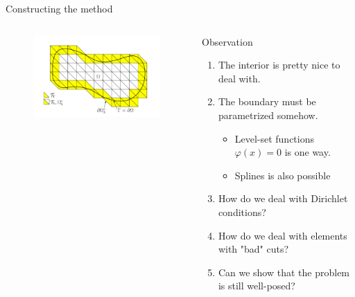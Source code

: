 \begin{frame}{Constructing the method}
        \begin{columns}
        \begin{column}{0.5\textwidth}
        \begin{figure}
            \centering
            \includegraphics[width=8.2cm]{figures/minimal_subset.png}
        \end{figure}
        \end{column}

        \begin{column}{0.5\textwidth}
        \begin{block}{Observation}
            \begin{enumerate}
                \item The interior is pretty nice to deal with.
                \item The boundary must be parametrized somehow.
                    \begin{itemize}
                        \item Level-set functions $\varphi ( x) = 0 $ is one way.
                        \item Splines is also possible
                    \end{itemize}
                \item How do we deal with Dirichlet conditions?
                \item How do we deal with elements with "bad" cuts?
                \item Can we show that the problem is still well-posed?
            \end{enumerate}
        \end{block}
        \end{column}
        \end{columns}

\end{frame}

